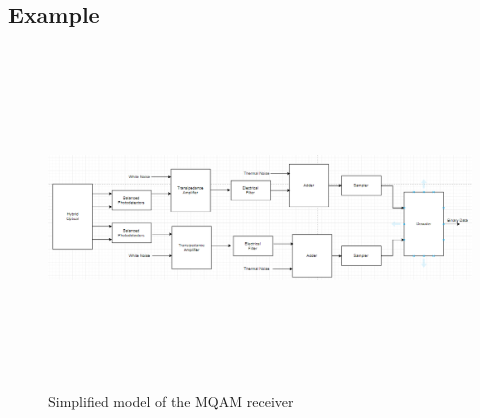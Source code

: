 \subsection*{Example}
\begin{figure}[H]
	\centering
	\includegraphics[scale=0.5, height=9cm, width=\textwidth]{../lib/m_qam_receiver/figures/receiver_diagram.png}
	\caption{Simplified model of the MQAM receiver}
	\label{fig:Coherent receiver}
\end{figure}
